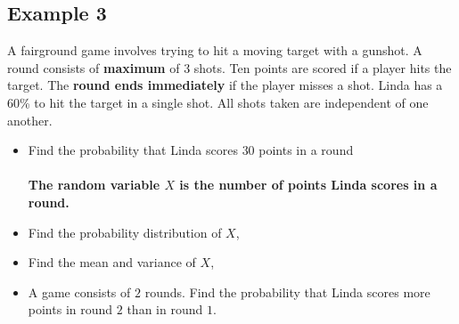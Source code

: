 \documentclass[../setup.tex]{subfiles}
\begin{document}
\subsection{Example 3}
\begin{example}
A fairground game involves trying to hit a moving target with a gunshot. A round consists of \textbf{maximum} of 3 shots. Ten points are scored if a player hits the target. The \textbf{round ends immediately} if the player misses a shot. Linda has a 60\% to hit the target in a single shot. All shots taken are independent of one another.
\begin{itemize}
	\item Find the probability that Linda scores $30$ points in a round \\ \\
\textbf{The random variable $X$ is the number of points Linda scores in a round.}
	\item Find the probability distribution of $X$,
	\item Find the mean and variance of $X$,
	\item A game consists of $2$ rounds. Find the probability that Linda scores more points in round $2$ than in round $1$.
\end{itemize}
\end{example}
\end{document}
